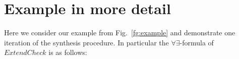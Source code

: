 \section{Example in more detail}
\label{app:ex}

Here we consider our example from Fig.~\ref{fg:example} and demonstrate one iteration of the synthesis procedure.
%
%
%
In particular the $\forall\exists$-formula of $\mathit{ExtendCheck}$ is as follows:%
%
